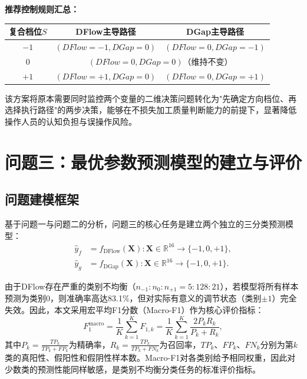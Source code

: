 \documentclass[UTF8,a4paper,12pt]{ctexart}
\begin{document}
\textbf{推荐控制规则汇总：}

\begin{center}
\begin{tabular}{c|cc}
\toprule
复合档位$S$ & DFlow主导路径 & DGap主导路径 \\
\midrule
$-1$ & $(DFlow=-1,DGap=0)$ & $(DFlow=0,DGap=-1)$ \\
$0$  & \multicolumn{2}{c}{$(DFlow=0,DGap=0)$（维持不变）} \\
$+1$ & $(DFlow=+1,DGap=0)$ & $(DFlow=0,DGap=+1)$ \\
\bottomrule
\end{tabular}
\end{center}

该方案将原本需要同时监控两个变量的二维决策问题转化为"先确定方向档位、再选择执行路径"的两步决策，能够在不损失加工质量判断能力的前提下，显著降低操作人员的认知负担与误操作风险。

\section{问题三：最优参数预测模型的建立与评价}
\label{sec:model}

\subsection{问题建模框架}

基于问题一与问题二的分析，问题三的核心任务是建立两个独立的三分类预测模型：
\begin{align}
\hat{y}_f &= f_{\text{DFlow}}(\bm{X}): \bm{X}\in\mathbb{R}^{16}\to\{-1,0,+1\}, \\
\hat{y}_g &= f_{\text{DGap}}(\bm{X}): \bm{X}\in\mathbb{R}^{16}\to\{-1,0,+1\}.
\end{align}

由于DFlow存在严重的类别不均衡（$n_{-1}:n_0:n_{+1}=5:128:21$），若模型将所有样本预测为类别$0$，则准确率高达83.1\%，但对实际有意义的调节状态（类别$\pm1$）完全失效。因此，本文采用宏平均F1分数（Macro-F1）作为核心评价指标：
\begin{equation}
F_1^{\text{macro}}=\frac{1}{K}\sum_{k=1}^{K}F_{1,k}=\frac{1}{K}\sum_{k=1}^{K}\frac{2P_kR_k}{P_k+R_k},
\label{eq:f1macro}
\end{equation}
其中$P_k=\frac{TP_k}{TP_k+FP_k}$为精确率，$R_k=\frac{TP_k}{TP_k+FN_k}$为召回率，$TP_k$、$FP_k$、$FN_k$分别为第$k$类的真阳性、假阳性和假阴性样本数。Macro-F1对各类别给予相同权重，因此对少数类的预测性能同样敏感，是类别不均衡分类任务的标准评价指标。
\end{document}
